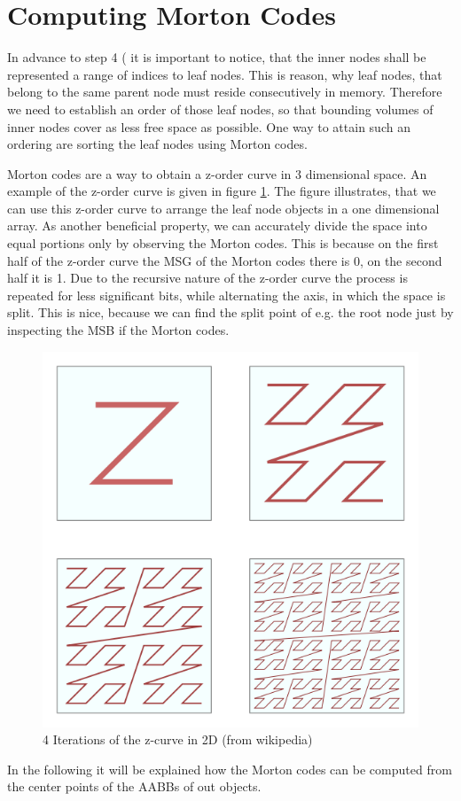 \documentclass[letterpaper, 10 pt, conference]{IEEEconf}  %
\begin{document}
\section{Computing Morton Codes}
\label{computemortoncodes}

In advance to step 4 ( it is important to notice, that the inner nodes shall be represented a range of indices to leaf nodes. This is reason, why leaf nodes, that belong to the same parent node must reside consecutively in memory. Therefore we need to establish an order of those leaf nodes, so that bounding volumes of inner nodes cover as less free space as possible. One way to attain such an ordering are sorting the leaf nodes using Morton codes.

Morton codes are a way to obtain a z-order curve in 3 dimensional space. An example of the z-order curve is given in figure \ref{fig:zcurve}. The figure illustrates, that we can use this z-order curve to arrange the leaf node objects in a one dimensional array. As another beneficial property, we can accurately divide the space into equal portions only by observing the Morton codes. This is because on the first half of the z-order curve the MSG of the Morton codes there is 0, on the second half it is 1. Due to the recursive nature of the z-order curve the process is repeated for less significant bits, while alternating the axis, in which the space is split. This is nice, because we can find the split point of e.g. the root node just by inspecting the MSB if the Morton codes.
\begin{figure}[!th]
   \centering
   \label{fig:zcurve}
   \includegraphics[width=0.8\linewidth]{figures/zcurve.png}
   \caption{4 Iterations of the z-curve in 2D (from wikipedia)}
\end{figure}
In the following it will be explained how the Morton codes can be computed from the center points of the AABBs of out objects.
\end{document}
